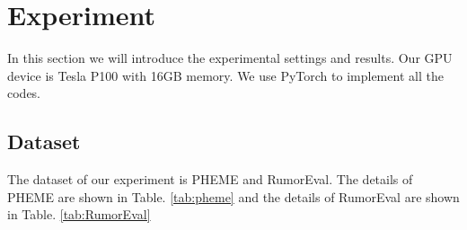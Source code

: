 \section{Experiment}
\label{sec:experiment}
In this section we will introduce the experimental settings and results. Our GPU device is Tesla P100 with 16GB memory. We use PyTorch to implement all the codes.

\subsection{Dataset}
\label{sec:dataset}
The dataset of our experiment is  PHEME \cite{DBLP:conf/coling/KochkinaLZ18} and RumorEval\cite{DBLP:conf/semeval/EnayetE17}. The details of PHEME are shown in Table. \ref{tab:pheme} and the details of RumorEval are shown in Table. \ref{tab:RumorEval}

\begin{table}[tbp]
	\caption{PHEME}
	\centering
	\label{tab:pheme}
\end{table}

\begin{table}[tbp]
	\caption{RumorEval}
	\centering
	\label{tab:RumorEval}
\end{table}
